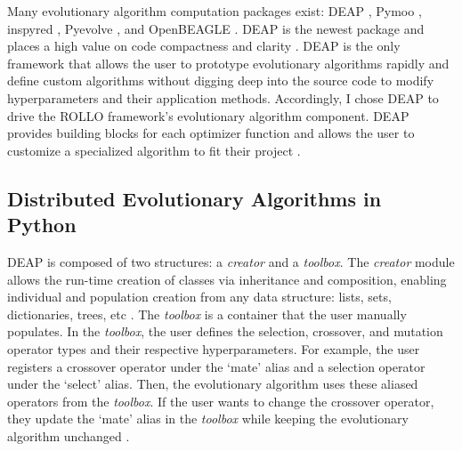 Many evolutionary algorithm computation packages exist: 
\gls{DEAP} \cite{fortin_deap_2012}, Pymoo \cite{blank_pymoo_2020}, inspyred 
\cite{garrett_inspyred_2014}, Pyevolve \cite{perone_pyevolve_2009}, and 
OpenBEAGLE \cite{gagne_open_2002}.
\gls{DEAP} is the newest package and places a high value on code 
compactness and clarity \cite{fortin_deap_2012}. 
\gls{DEAP} is the only framework that allows the user to prototype evolutionary 
algorithms rapidly and define custom algorithms without digging deep into 
the source code to modify hyperparameters and their application methods.
Accordingly, I chose \gls{DEAP} to drive the \gls{ROLLO} framework's 
evolutionary algorithm component. 
\gls{DEAP} provides building blocks for each optimizer function and allows the 
user to customize a specialized algorithm to fit their project \cite{fortin_deap_2012}.

\subsection{Distributed Evolutionary Algorithms in Python}
\label{sec:deap-works}
\gls{DEAP} is composed of two structures: a \textit{creator} and a 
\textit{toolbox}.  
The \textit{creator} module allows the run-time creation of classes via 
inheritance and composition, enabling individual and population creation 
from any data structure: lists, sets, dictionaries, trees, etc \cite{fortin_deap_2012}. 
The \textit{toolbox} is a container that the user manually populates.
In the \textit{toolbox}, the user defines the selection, crossover, and 
mutation operator types and their respective hyperparameters.
For example, the user registers a crossover operator under the `mate'
alias and a selection operator under the `select' alias. 
Then, the evolutionary algorithm uses these aliased operators from the 
\textit{toolbox}. 
If the user wants to change the crossover operator, they update the 
`mate' alias in the \textit{toolbox} while keeping the evolutionary algorithm 
unchanged \cite{fortin_deap_2012}. 

